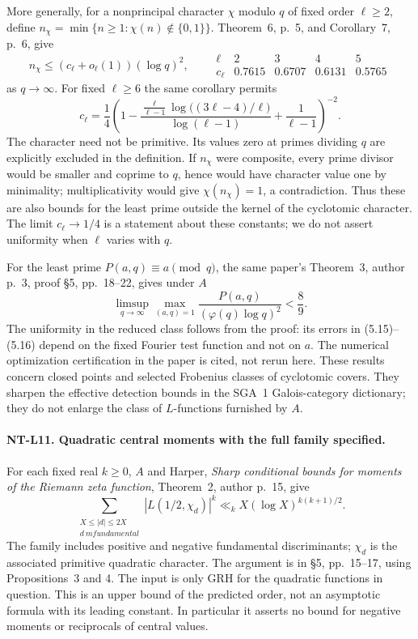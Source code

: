 \documentclass[11pt,a4paper]{article}
\begin{document}
More generally, for a nonprincipal character $\chi$ modulo $q$ of
fixed order $\ell\ge2$, define
$n_\chi=\min\{n\ge1:\chi(n)\notin\{0,1\}\}$.
Theorem~6, p.~5, and Corollary~7, p.~6, give
\[
 n_\chi\le(c_\ell+o_\ell(1))(\log q)^2,
 \qquad
 \begin{array}{c|rrrr}
   \ell&2&3&4&5\\ \hline
   c_\ell&0.7615&0.6707&0.6131&0.5765
 \end{array}
\tag{NT-P15}
\]
as $q\to\infty$.  For fixed $\ell\ge6$ the same corollary permits
\[
 c_\ell=\frac14\left(
  1-\frac{\frac{\ell}{\ell-1}\log\bigl((3\ell-4)/\ell\bigr)}
             {\log(\ell-1)}+\frac1{\ell-1}\right)^{-2}.
\]
The character need not be primitive.  Its values zero at primes
dividing $q$ are explicitly excluded in the definition.  If
$n_\chi$ were composite, every prime divisor would be smaller and
coprime to $q$, hence would have character value one by minimality;
multiplicativity would give $\chi(n_\chi)=1$, a contradiction.
Thus these are also bounds for the least prime outside the kernel
of the cyclotomic character.  The limit $c_\ell\to1/4$ is a
statement about these constants; we do not assert uniformity when
$\ell$ varies with $q$.

For the least prime $P(a,q)\equiv a\pmod q$, the same paper's
Theorem~3, author p.~3, proof \S5, pp.~18--22, gives under $A$
\[
 \limsup_{q\to\infty}
  \max_{(a,q)=1}\frac{P(a,q)}{(\varphi(q)\log q)^2}<\frac89.
\tag{NT-P16}
\]
The uniformity in the reduced class follows from the proof: its
errors in (5.15)--(5.16) depend on the fixed Fourier test function
and not on $a$.  The numerical optimization certification in the
paper is cited, not rerun here.  These results concern closed points
and selected Frobenius classes of cyclotomic covers.  They sharpen
the effective detection bounds in the SGA~1 Galois-category
dictionary; they do not enlarge the class of $L$-functions furnished
by $A$.

\paragraph{NT-L11. Quadratic central moments with the full family specified.}
For each fixed real $k\ge0$, $A$ and Harper,
\emph{Sharp conditional bounds for moments of the Riemann zeta
function}, Theorem~2, author p.~15, give
\[
 \sum_{\substack{X\le |d|\le2X\\d\ {
m fundamental}}}
       |L(1/2,\chi_d)|^k
     \ll_k X(\log X)^{k(k+1)/2}.
\tag{NT-L11}
\]
The family includes positive and negative fundamental discriminants;
$\chi_d$ is the associated primitive quadratic character.  The
argument is in \S5, pp.~15--17, using Propositions~3 and 4.
The input is only GRH for the quadratic functions in question.
This is an upper bound of the predicted order, not an asymptotic
formula with its leading constant.  In particular it asserts no
bound for negative moments or reciprocals of central values.
\end{document}
